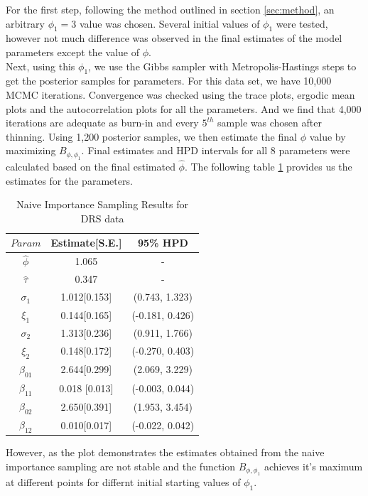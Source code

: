 \documentclass[11pt]{article}
\theoremstyle{remboldstyle}
\begin{document}
For the first step, following the method outlined in section \ref{sec:method}, an arbitrary $\phi_1 = 3$ value was chosen. Several initial values of $\phi_1$ were tested, however not much difference was observed in the final estimates of the model parameters except the value of $\phi$. \\
Next, using this $\phi_1$, we use the Gibbs sampler with Metropolis-Hastings steps to get the posterior samples for parameters. For this data set, we have 10,000 MCMC iterations. Convergence was checked using the trace plots, ergodic mean plots and the autocorrelation plots for all the parameters. And we find that 4,000 iterations are adequate as burn-in and every $5^{th}$ sample was chosen after thinning. Using 1,200 posterior samples, we then estimate the final $\phi$ value by maximizing $B_{\phi, \phi_1}$. Final estimates and HPD intervals for all 8 parameters were calculated based on the final estimated $\hat{\phi}$. The following table \ref{tab3} provides us the estimates for the parameters.
\begin{table}[H]
\caption{Naive Importance Sampling Results for DRS data}
\centering
\begin{tabular}{c c c}
\hline
$Param$      & Estimate[S.E.] & 95\% HPD\\
\hline
$\hat{\phi}$ & 1.065              & -\\
$\hat{\tau}$ & 0.347              & -\\
$\sigma_1$      & 1.012[0.153]        & (0.743, 1.323)\\   
$\xi_1$      & 0.144[0.165]        & (-0.181, 0.426)\\
$\sigma_2$ & 1.313[0.236]              & (0.911, 1.766)\\
$\xi_2$      & 0.148[0.172]        & (-0.270, 0.403)\\   
$\beta_{01}$      & 2.644[0.299]        & (2.069, 3.229)\\
$\beta_{11}$ & 0.018 [0.013]             & (-0.003, 0.044)\\
$\beta_{02}$      & 2.650[0.391]        & (1.953, 3.454)\\   
$\beta_{12}$      & 0.010[0.017]        & (-0.022, 0.042)\\
 \hline             
\end{tabular}
\label{tab3}
\end{table}
\noindent
However, as the plot demonstrates the estimates obtained from the naive importance sampling are not stable and the function $B_{\phi, \phi_1}$ achieves it's maximum at different points for differnt initial starting values of $\phi_1$. \\
\end{document}
